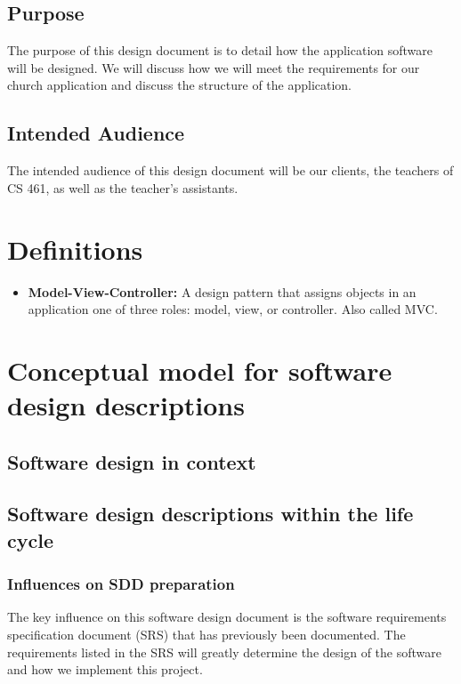 \documentclass[letterpaper,10pt,draftclsnofoot,onecolumn,titlepage]{IEEEtran}
\begin{document}
		\subsection{Purpose}
			The purpose of this design document is to detail how the application software will be designed.
			We will discuss how we will meet the requirements for our church application and discuss the structure of the application.
		\subsection{Intended Audience}
			The intended audience of this design document will be our clients, the teachers of CS 461, as well as the teacher's assistants.


	\section{Definitions}
		\begin{itemize}
			\item \textbf{Model-View-Controller:} A design pattern that assigns objects in an application one of three roles: model, view, or controller. Also called MVC.
		\end{itemize}


	\section{Conceptual model for software design descriptions}

		\subsection{Software design in context}

		\subsection{Software design descriptions within the life cycle}

			\subsubsection{Influences on SDD preparation}
				The key influence on this software design document is the software requirements specification document (SRS) that has previously been documented.
				The requirements listed in the SRS will greatly determine the design of the software and how we implement this project.
\end{document}
